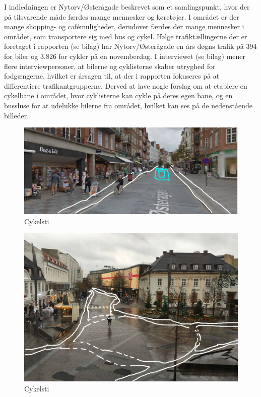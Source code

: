 I indledningen er Nytorv/Østerågade beskrevet som et samlingspunkt, hvor der på tilsvarende måde færdes mange mennesker og køretøjer. I området er der mange shopping- og cafémuligheder, derudover færdes der mange mennesker i området, som transportere sig med bus og cykel. Ifølge trafiktællingerne der er foretaget i rapporten (se bilag) har Nytorv/Østerågade en års døgns trafik på 394 for biler og 3.826 for cykler på en novemberdag. I interviewet (se bilag) mener flere interviewpersoner, at bilerne og cyklisterne skaber utryghed for fodgængerne, hvilket er årsagen til, at der i rapporten fokuseres på at differentiere trafikantgrupperne. Derved at lave nogle forslag om at etablere en cykelbane i området, hvor cyklisterne kan cykle på deres egen bane, og en bussluse for at udelukke bilerne fra området, hvilket kan ses på de nedenstående billeder.
\begin{figure}[htbp]
  \centering
  \begin{adjustbox}{max width=\textwidth}
    \includegraphics{figures/Billederogfigur/Losningsforslag_cykelsti/Cykelsti_gennem_bogo.png}
 \end{adjustbox}
  \caption{Cykelsti}
   \label{fig:cykelsti}
\end{figure}

\begin{figure}[htbp]
  \centering
  \begin{adjustbox}{max width=\textwidth}
    \includegraphics{figures/Billederogfigur/Losningsforslag_cykelsti/cykelsti_ved_knudepunktet.png}
 \end{adjustbox}
  \caption{Cykelsti}
   \label{fig:cykelsti}
\end{figure}
